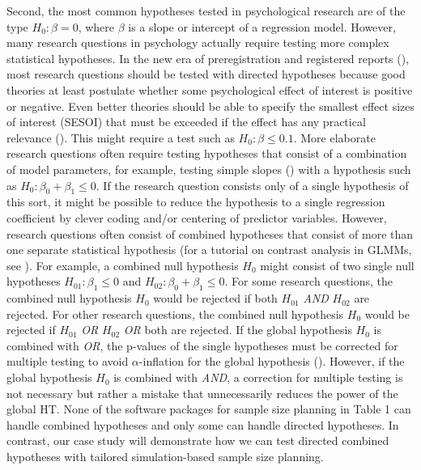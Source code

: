 \documentclass[
  man,
  floatsintext,
  longtable,
  a4paper,
  nolmodern,
  notxfonts,
  notimes,
  colorlinks=true,linkcolor=blue,citecolor=blue,urlcolor=blue]{apa7}
\begin{document}
Second, the most common hypotheses tested in psychological research are
of the type \(H_0: \beta = 0\), where \(\beta\) is a slope or intercept
of a regression model. However, many research questions in psychology
actually require testing more complex statistical hypotheses. In the new
era of preregistration and registered reports
(), most research questions should be tested with directed
hypotheses because good theories at least postulate whether some
psychological effect of interest is positive or negative. Even better
theories should be able to specify the smallest effect sizes of interest
(SESOI) that must be exceeded if the effect has any practical relevance
(). This might require a test such as
\(H_0: \beta \leq 0.1\). More elaborate research questions often require
testing hypotheses that consist of a combination of model parameters,
for example, testing simple slopes
() with a hypothesis such as \(H_0: \beta_0 + \beta_1 \leq 0\). If
the research question consists only of a single hypothesis of this sort,
it might be possible to reduce the hypothesis to a single regression
coefficient by clever coding and/or centering of predictor variables.
However, research questions often consist of combined hypotheses that
consist of more than one separate statistical hypothesis (for a tutorial
on contrast analysis in GLMMs, see
). For
example, a combined null hypothesis \(H_0\) might consist of two single
null hypotheses \(H_{01}: \beta_1 \leq 0\) and
\(H_{02}: \beta_0 + \beta_1 \leq 0\). For some research questions, the
combined null hypothesis \(H_0\) would be rejected if both \(H_{01}\)
\emph{AND} \(H_{02}\) are rejected. For other research questions, the
combined null hypothesis \(H_0\) would be rejected if \(H_{01}\)
\emph{OR} \(H_{02}\) \emph{OR} both are rejected. If the global
hypothesis \(H_0\) is combined with \emph{OR}, the p-values of the
single hypotheses must be corrected for multiple testing to avoid
\(\alpha\)-inflation for the global hypothesis
(). However, if the global hypothesis \(H_0\) is
combined with \emph{AND}, a correction for multiple testing is not
necessary but rather a mistake that unnecessarily reduces the power of
the global HT. None of the software packages for sample size planning in
Table 1 can handle combined hypotheses and only some can handle directed
hypotheses. In contrast, our case study will demonstrate how we can test
directed combined hypotheses with tailored simulation-based sample size
planning.
\end{document}
